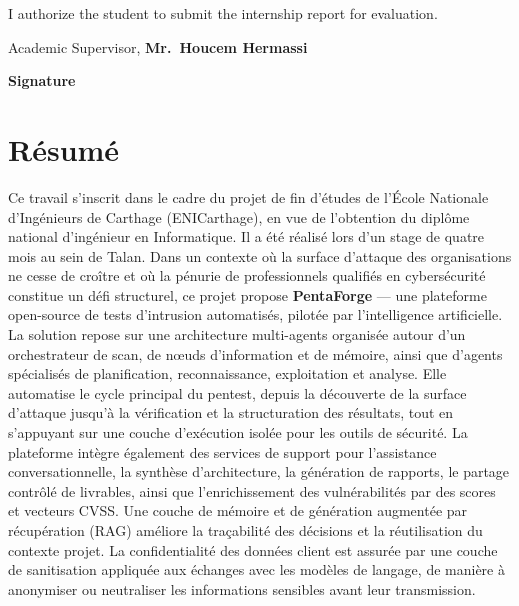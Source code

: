 \documentclass[12pt,a4paper]{report}
\begin{document}
\vspace{1.1cm}

\begin{tcolorbox}[
    enhanced,
    colback=white,
    colframe=black!70,
    boxrule=0.9pt,
    arc=4mm,
    width=\textwidth,
    left=12mm,
    right=12mm,
    top=11mm,
    bottom=11mm
]
I authorize the student to submit the internship report for evaluation.

\vspace{1.1cm}

\centering
Academic Supervisor, \textbf{Mr.\ Houcem Hermassi}

\vspace{1.6cm}

\begin{flushright}
\textbf{Signature}
\end{flushright}
\end{tcolorbox}

\newpage
\thispagestyle{fancy}
\section*{R\'{e}sum\'{e}}

Ce travail s'inscrit dans le cadre du projet de fin d'\'{e}tudes de l'\'{E}cole Nationale
d'Ing\'{e}nieurs de Carthage (ENICarthage), en vue de l'obtention du dipl\^{o}me national
d'ing\'{e}nieur en Informatique. Il a \'{e}t\'{e} r\'{e}alis\'{e} lors d'un stage de quatre mois au sein de Talan.
Dans un contexte o\`{u} la surface d'attaque des organisations ne cesse de cro\^{i}tre et o\`{u}
la p\'{e}nurie de professionnels qualifi\'{e}s en cybers\'{e}curit\'{e} constitue un d\'{e}fi structurel,
ce projet propose \textbf{PentaForge} --- une plateforme open-source de tests d'intrusion
automatis\'{e}s, pilot\'{e}e par l'intelligence artificielle. La solution repose sur une
architecture multi-agents organis\'{e}e autour d'un orchestrateur de scan, de n\oe uds
d'information et de m\'{e}moire, ainsi que d'agents sp\'{e}cialis\'{e}s de planification,
reconnaissance, exploitation et analyse. Elle automatise le cycle principal du pentest,
depuis la d\'{e}couverte de la surface d'attaque jusqu'\`{a} la v\'{e}rification et la
structuration des r\'{e}sultats, tout en s'appuyant sur une couche d'ex\'{e}cution isol\'{e}e
pour les outils de s\'{e}curit\'{e}. La plateforme int\`{e}gre \'{e}galement des services
de support pour l'assistance conversationnelle, la synth\`{e}se d'architecture, la
g\'{e}n\'{e}ration de rapports, le partage contr\^{o}l\'{e} de livrables, ainsi que
l'enrichissement des vuln\'{e}rabilit\'{e}s par des scores et vecteurs CVSS. Une couche
de m\'{e}moire et de g\'{e}n\'{e}ration augment\'{e}e par r\'{e}cup\'{e}ration (RAG) am\'{e}liore la
tra\c{c}abilit\'{e} des d\'{e}cisions et la r\'{e}utilisation du contexte projet. La
confidentialit\'{e} des donn\'{e}es client est assur\'{e}e par une couche de sanitisation
appliqu\'{e}e aux \'{e}changes avec les mod\`{e}les de langage, de mani\`{e}re \`{a} anonymiser
ou neutraliser les informations sensibles avant leur transmission.
\end{document}
